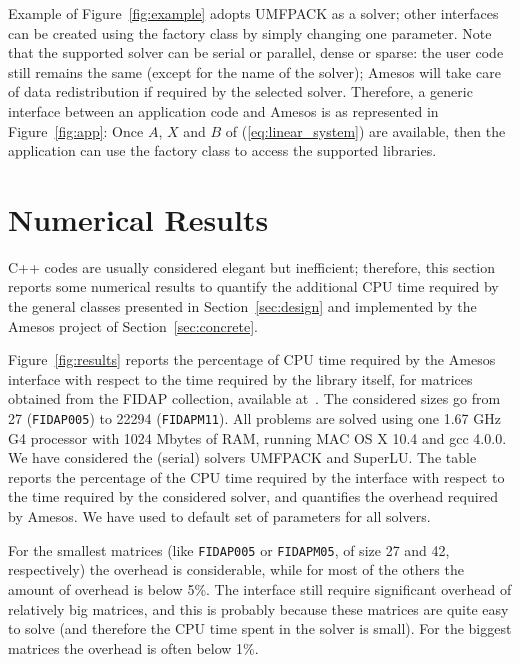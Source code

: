 \documentclass[acmtocl]{acmtrans2m}
\begin{document}
Example of Figure~\ref{fig:example} adopts UMFPACK as a solver; other
interfaces can be created using the factory class by simply changing one
parameter. Note that the supported solver can be serial or parallel, dense or
sparse: the user code still remains the same (except for the name of the
                                              solver); Amesos will take care
of data redistribution if required by the selected solver. Therefore, a
generic interface between an application code and Amesos is as represented in
Figure~\ref{fig:app}: Once $A$, $X$ and $B$ of (\ref{eq:linear_system}) are
available, then the application can use the factory class to access the
supported libraries.

\section{Numerical Results}
\label{sec:numerical}

C++ codes are usually considered elegant but inefficient; therefore, this
section reports some numerical results to quantify the additional CPU time
required by the general classes presented in Section~\ref{sec:design} and
implemented by the Amesos project of Section~\ref{sec:concrete}.

Figure~\ref{fig:results} reports the percentage of CPU time required by the Amesos
interface with respect to the time required by the library itself, 
  for matrices obtained from the FIDAP collection, available
at~\cite{matrix-market}. The considered sizes go from 27 
({\tt FIDAP005}) to 22294 ({\tt FIDAPM11}). All problems are solved using one
1.67 GHz G4 processor with 1024 Mbytes of RAM, running MAC OS X 10.4 and gcc
4.0.0. We have considered the (serial) solvers UMFPACK and
SuperLU. The table reports the percentage of the CPU time required by the
interface with respect to the time required by the considered solver, and
quantifies the overhead required by Amesos. We have used to default set of
parameters for all solvers.

For the smallest matrices (like \verb!FIDAP005! or \verb!FIDAPM05!, of size
27 and 42, respectively)
the overhead is considerable, while for most of the others the amount of
overhead is below 5\%. The interface still require significant overhead of
relatively big matrices, and this is probably because these matrices are quite
easy to solve (and therefore the CPU time spent in the solver is small).
For the biggest matrices the overhead is often below 1\%.
\end{document}
